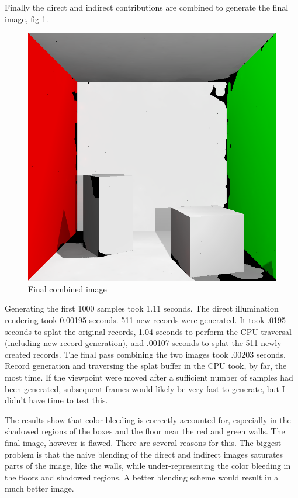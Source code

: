 \documentclass[10pt,twopage]{acmsiggraph}
\begin{document}
Finally the direct and indirect contributions are combined to generate the final image, fig \ref{final}.

\begin{figure}[htbp]
\begin{center}
\includegraphics[scale = .3]{finalResult.png}
\caption{Final combined image}
\label{final}
\end{center}
\end{figure}

Generating the first 1000 samples took 1.11 seconds.  The direct illumination rendering took 0.00195 seconds.  511 new records were generated.  It took .0195 seconds to splat the original records, 1.04 seconds to perform the CPU traversal (including new record generation), and .00107 seconds to splat the 511 newly created records.  The final pass combining the two images took .00203 seconds.  Record generation and traversing the splat buffer in the CPU took, by far, the most time.  If the viewpoint were moved after a sufficient number of samples had been generated, subsequent frames would likely be very fast to generate, but I didn't have time to test this.

The results show that color bleeding is correctly accounted for, especially in the shadowed regions of the boxes and the floor near the red and green walls.  The final image, however is flawed.  There are several reasons for this.  The biggest problem is that the naive blending of the direct and indirect images saturates parts of the image, like the walls, while under-representing the color bleeding in the floors and shadowed regions.  A better blending scheme would result in a much better image.
\end{document}
